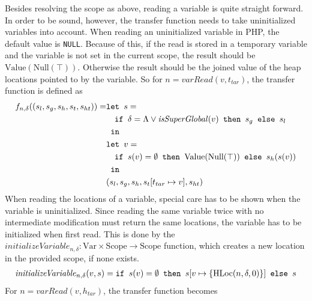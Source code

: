 Besides resolving the scope as above, reading a variable is quite straight forward. In order to be sound, however, the transfer function needs to take uninitialized variables into account. When reading an uninitialized variable in PHP, the default value is \texttt{NULL}. Because of this, if the read is stored in a temporary variable and the variable is not set in the current scope, the result should be $\text{Value}(\text{Null}(\top))$. Otherwise the result should be the joined value of the heap locations pointed to by the variable. So for $n = \mathit{varRead}(v,t_{tar})$, the transfer function is defined as
\begin{align}
f_{n, \delta} ((s_l,s_g,s_h,s_t, s_{ht})) = &\texttt{let } s = \notag\\
                                            &\quad\texttt{if }\delta = \Lambda \vee \mathit{isSuperGlobal}(v)\texttt{ then } s_g \texttt{ else } s_l\notag\\
                                            & \texttt{ in }\notag\\
                                            &\texttt{let } v = \notag\\
                                            &\quad\texttt{if }s(v) = \emptyset\texttt{ then } \text{Value}(\text{Null}(\top)) \texttt{ else } s_h(s(v))\notag\\
                                            & \texttt{ in }\notag\\
                                            &(s_l,s_g,s_h,s_t[t_{tar}\mapsto v], s_{ht})
\end{align}
When reading the locations of a variable, special care has to be shown when the variable is uninitialized. Since reading the same variable twice with no intermediate modification must return the same locations, the variable has to be initialized when first read. This is done by the $\mathit{initializeVariable}_{n,\delta} : \text{Var}\times\text{Scope}\rightarrow \text{Scope}$ function, which creates a new location in the provided scope, if none exists. 
\begin{align}
\mathit{initializeVariable}_{n, \delta}(v,s) = \texttt{if }s(v) = \emptyset\texttt{ then } s[v\mapsto \{\text{HLoc}(n,\delta, 0)\}] \texttt{ else } s
\end{align}
For $n = \mathit{varRead}(v,h_{tar})$, the transfer function becomes

